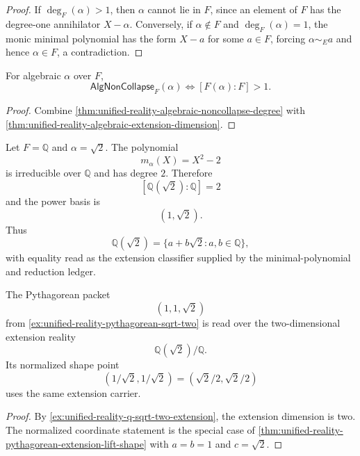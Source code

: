 \begin{proof}
If $\deg_F(\alpha)>1$, then $\alpha$ cannot lie in $F$, since an
element of $F$ has the degree-one annihilator $X-\alpha$. Conversely, if
$\alpha\notin F$ and $\deg_F(\alpha)=1$, the monic minimal polynomial
has the form $X-a$ for some $a\in F$, forcing $\alpha\sim_Ea$ and hence
$\alpha\in F$, a contradiction.
\end{proof}

\begin{corollary}
\label{cor:unified-reality-algebraic-information-dimension-noncollapse}
For algebraic $\alpha$ over $F$,
$$
\mathsf{AlgNonCollapse}_F(\alpha)
\Longleftrightarrow
[F(\alpha):F]>1.
$$
\end{corollary}

\begin{proof}
Combine
\autoref{thm:unified-reality-algebraic-noncollapse-degree} with
\autoref{thm:unified-reality-algebraic-extension-dimension}.
\end{proof}

\begin{example}
\label{ex:unified-reality-q-sqrt-two-extension}
Let $F=\mathbb Q$ and $\alpha=\sqrt{2}$. The polynomial
$$
m_\alpha(X)=X^2-2
$$
is irreducible over $\mathbb Q$ and has degree $2$. Therefore
$$
[\mathbb Q(\sqrt{2}):\mathbb Q]=2
$$
and the power basis is
$$
(1,\sqrt{2}).
$$
Thus
$$
\mathbb Q(\sqrt{2})
=
\{a+b\sqrt{2}:a,b\in\mathbb Q\},
$$
with equality read as the extension classifier supplied by the
minimal-polynomial and reduction ledger.
\end{example}

\begin{corollary}
\label{cor:unified-reality-pythagorean-irrational-scale-dimension}
The Pythagorean packet
$$
(1,1,\sqrt{2})
$$
from \autoref{ex:unified-reality-pythagorean-sqrt-two} is read over the
two-dimensional extension reality
$$
\mathbb Q(\sqrt{2})/\mathbb Q.
$$
Its normalized shape point
$$
(1/\sqrt{2},1/\sqrt{2})
=
(\sqrt{2}/2,\sqrt{2}/2)
$$
uses the same extension carrier.
\end{corollary}

\begin{proof}
By \autoref{ex:unified-reality-q-sqrt-two-extension}, the extension
dimension is two. The normalized coordinate statement is the special
case of
\autoref{thm:unified-reality-pythagorean-extension-lift-shape} with
$a=b=1$ and $c=\sqrt{2}$.
\end{proof}

